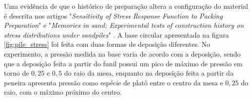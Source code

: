     Uma evidência de que o histórico de preparação altera a configuração do material é descrita nos artigos "\textit{Sensitivity of Stress Response Function to Packing Preparation}" e "\textit{Memories in sand: Experimental tests of construction history on stress distributions under sandpiles}" \cite{Sensitivity_of_Stress_Response_Function_to_Packing_Preparation, Memories_in_Sand}. A base circular apresentada na figura \ref{fig:pile_stress} foi feita com duas formas de deposição diferentes. No experimento, a pressão medida na base varia de acordo com a deposição, sendo que a deposição feita a partir do funil possui um pico de máximo de pressão em torno de $0,25$ e $0,5$ do raio da mesa, enquanto na deposição feita a partir da peneira apresenta pressão como espécie de platô entre o centro da mesa e $0,25$ do raio, com o máximo próximo do centro.

